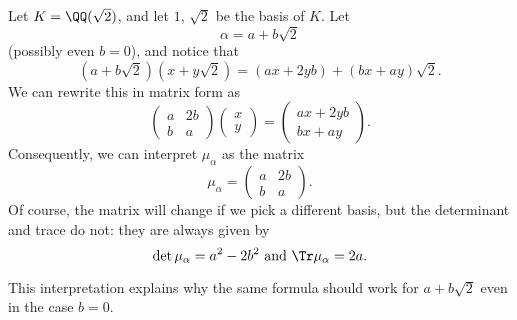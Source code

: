 \begin{example}
	Let $K = \QQ(\sqrt2)$, and let $1$, $\sqrt 2$ be the basis of $K$.
	Let \[ \alpha = a + b \sqrt 2 \] (possibly even $b = 0$), and notice that
	\[ \left( a+b\sqrt2 \right)\left( x+y\sqrt2 \right)
		= (ax+2yb) + (bx+ay)\sqrt2. \]
	We can rewrite this in matrix form as
	\[ 
		\left(
		\begin{array}{cc}
			a & 2b \\
			b & a
		\end{array}
		\right)
		\left(
		\begin{array}{c}
			x \\
			y
		\end{array}
		\right)
		=
		\left(
		\begin{array}{c}
			ax+2yb \\
			bx+ay
		\end{array}
		\right).
	\]
	Consequently, we can interpret $\mu_\alpha$ as the matrix
	\[ \mu_\alpha = \left(
		\begin{array}{cc}
			a & 2b \\
			b & a
		\end{array}
		\right). \]
	Of course, the matrix will change if we pick a different basis,
	but the determinant and trace do not: they are always given by
	\[ \det \mu_\alpha = a^2-2b^2 \text{ and }
		\Tr \mu_\alpha = 2a. \]
\end{example}
This interpretation explains why the same formula should work for $a+b\sqrt 2$
even in the case $b = 0$.

